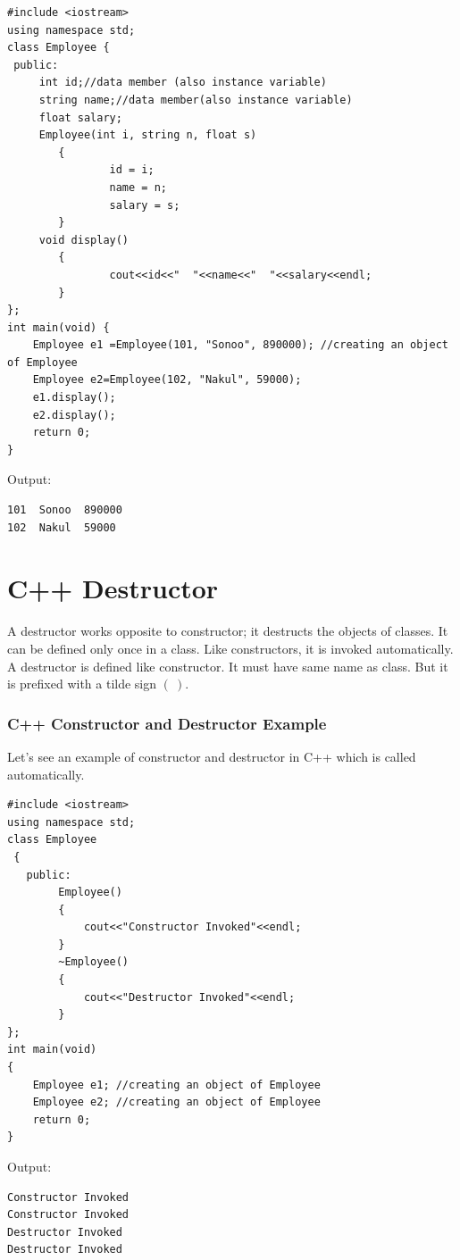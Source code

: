 \documentclass{book}
\begin{document}
\begin{lstlisting}
#include <iostream>
using namespace std;
class Employee {
 public:
	 int id;//data member (also instance variable)    
	 string name;//data member(also instance variable)
	 float salary;
	 Employee(int i, string n, float s)  
		{  
				id = i;  
				name = n;  
				salary = s;
		}  
	 void display()  
		{  
				cout<<id<<"  "<<name<<"  "<<salary<<endl;  
		}  
};
int main(void) {
	Employee e1 =Employee(101, "Sonoo", 890000); //creating an object of Employee 
	Employee e2=Employee(102, "Nakul", 59000); 
	e1.display();  
	e2.display();  
	return 0;
}
\end{lstlisting} 

Output:

\begin{verbatim}
101  Sonoo  890000
102  Nakul  59000
\end{verbatim} 

\section{C++ Destructor}

A destructor works opposite to constructor; it destructs the objects of classes. It can be defined only once in a class. Like constructors, it is invoked automatically. 
A destructor is defined like constructor. It must have same name as class. But it is prefixed with a tilde sign $(~)$.

\subsubsection{C++ Constructor and Destructor Example}

Let's see an example of constructor and destructor in C++ which is called automatically.

\begin{lstlisting}
#include <iostream>  
using namespace std;  
class Employee  
 {  
   public:  
		Employee()    
		{    
			cout<<"Constructor Invoked"<<endl;    
		}    
		~Employee()    
		{    
			cout<<"Destructor Invoked"<<endl;    
		}  
};  
int main(void)   
{  
	Employee e1; //creating an object of Employee   
	Employee e2; //creating an object of Employee  
	return 0;  
}
\end{lstlisting}
  
Output:

\begin{verbatim} 
Constructor Invoked
Constructor Invoked
Destructor Invoked
Destructor Invoked
\end{verbatim} 
\end{document}
